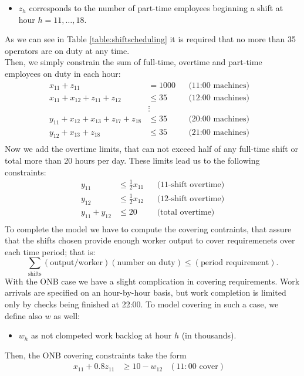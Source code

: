 \documentclass[a4paper,10 pt,titlepage,twoside]{book}
\theoremstyle{plain}
\theoremstyle{definition}
\theoremstyle{remark}
\begin{document}
{{\begin{itemize}
	\item $z_{h}$ corresponds to the number of part-time employees beginning a shift at hour $h=11, \dots, 18$.
\end{itemize}
As we can see in Table \ref{table:shiftscheduling} it is required that no more than 35 operators are on duty at any time. \\Then, we simply constrain the sum of full-time, overtime and part-time employees on duty in each hour:
\begin{align*}
x_{11}+z_{11}&= 1000&&\text{(11:00 machines)}&\\
x_{11}+x_{12}+z_{11}+z_{12}&\leq 35&&\text{(12:00 machines)}&\\
&\vdots&&\\
y_{11}+x_{12}+x_{13}+z_{17}+z_{18}&\leq35&&\text{(20:00 machines)}&\\
y_{12}+x_{13}+z_{18}&\leq35&&\text{(21:00 machines)}&\\
\end{align*}
Now we add the overtime limits, that can not exceed half of any full-time shift or total more than 20 hours per day. These limits lead us to the following constraints:
\begin{align*}
y_{11}&\leq \frac{1}{2}x_{11}&&\text{(11-shift overtime)}\\
      y_{12}&\leq \frac{1}{2}x_{12}&&\text{(12-shift overtime)}\\
y_{11}+y_{12}&\leq 20&&\text{(total overtime)}\\
\end{align*}
To complete the model we have to compute the covering contraints, that assure that the shifts chosen provide enough worker output to cover requiremenets over each time period; that is:
\begin{equation*}
\sum\limits_{\text{shifts}}(\text{output/worker})(\text{number on duty})\leq(\text{period requirement}).
\end{equation*}		
With the ONB case we have a slight complication in covering requirements. Work arrivals are specified on an hour-by-hour basis, but work completion is limited only by checks being finished at 22:00. To model covering in such a case, we define also $w$ as well:
\begin{itemize}
	\item $w_{h}$ as not clompeted work backlog at hour $h$ (in thousands).
\end{itemize}
Then, the ONB covering constraints take the form
\begin{align*}
x_{11}+0.8z_{11}&\geq 10 - w_{12}&(11:00 \text{ cover})&\\

\end{align*}}}
\end{document}
